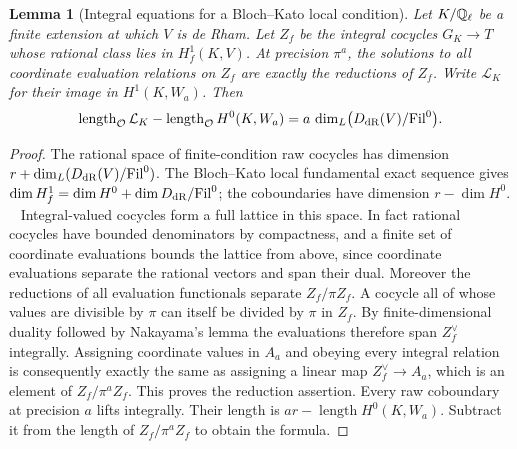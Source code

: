 \documentclass[a4paper,11pt]{article}
\newtheorem{lemma}[proposition]{Lemma}
\theoremstyle{definition}
\theoremstyle{remark}
\numberwithin{equation}{section}
\begin{document}
\begin{lemma}[Integral equations for a Bloch--Kato local condition]
\leavevmode\label{lem:localevaluation728}
Let \(K/\mathbb Q_\ell\) be a finite extension at which \(V\) is de Rham.
Let \(Z_f\) be the integral cocycles \(G_K\to T\) whose rational
class lies in \(H^1_f(K,V)\). At precision \(\pi^a\), the solutions to
all coordinate evaluation relations on \(Z_f\) are exactly the
reductions of \(Z_f\). Write \(\mathcal L_K\) for their image in
\(H^1(K,W_a)\). Then
\[
   \operatorname{length}_{\mathcal O}\mathcal L_K
       -\operatorname{length}_{\mathcal O}H^0(K,W_a)
        = a\,\dim_L\bigl(D_{\rm dR}(V)/\mathrm{Fil}^0\bigr).
\]
\end{lemma}
\begin{proof}
The rational space of finite-condition raw cocycles has dimension
\(r+\dim_L(D_{\rm dR}(V)/\mathrm{Fil}^0)\). The Bloch--Kato local
fundamental exact sequence gives
\(\dim H^1_f=\dim H^0+\dim D_{\rm dR}/\mathrm{Fil}^0\);
the coboundaries have dimension \(r-\dim H^0\).
~\cite[Cor.~3.8.4]{II-II-II-bktate717}
Integral-valued cocycles form a full lattice in this space. In fact
rational cocycles have bounded denominators by compactness, and a
finite set of coordinate evaluations bounds the lattice from above, since coordinate evaluations separate the rational vectors and span
their dual. Moreover the reductions of all evaluation functionals
separate \(Z_f/\pi Z_f\). A cocycle all of whose values are divisible
by \(\pi\) can itself be divided by \(\pi\) in \(Z_f\).
By finite-dimensional duality followed by Nakayama's lemma the
evaluations therefore span \(Z_f^\vee\) integrally. Assigning coordinate
values in \(A_a\) and obeying every integral relation is consequently
exactly the same as assigning a linear map \(Z_f^\vee\to A_a\),
which is an element of \(Z_f/\pi^aZ_f\). This proves the reduction
assertion. Every raw coboundary at precision \(a\) lifts integrally.
Their length is \(ar-\operatorname{length}H^0(K,W_a)\).
Subtract it from the length of \(Z_f/\pi^aZ_f\) to obtain the formula.
\end{proof}
\end{document}
